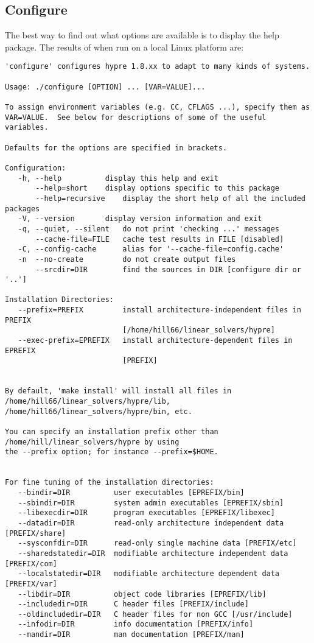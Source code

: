 \subsection{Configure}
\label{Configure}


The best way to find out what options are available is to display the help package.
The results of  when run on a local Linux platform are:
\begin{verbatim}
'configure' configures hypre 1.8.xx to adapt to many kinds of systems.

Usage: ./configure [OPTION] ... [VAR=VALUE]...

To assign environment variables (e.g. CC, CFLAGS ...), specify them as
VAR=VALUE.  See below for descriptions of some of the useful variables.

Defaults for the options are specified in brackets.

Configuration:
   -h, --help		   display this help and exit
       --help=short	   display options specific to this package
       --help=recursive	   display the short help of all the included packages
   -V, --version	   display version information and exit
   -q, --quiet, --silent   do not print 'checking ...' messages
       --cache-file=FILE   cache test results in FILE [disabled]
   -C, --config-cache      alias for '--cache-file=config.cache'
   -n  --no-create         do not create output files
       --srcdir=DIR        find the sources in DIR [configure dir or '..']

Installation Directories:
   --prefix=PREFIX         install architecture-independent files in PREFIX
                           [/home/hill66/linear_solvers/hypre]
   --exec-prefix=EPREFIX   install architecture-dependent files in EPREFIX 
                           [PREFIX]


By default, 'make install' will install all files in
/home/hill66/linear_solvers/hypre/lib, /home/hill66/linear_solvers/hypre/bin, etc.

You can specify an installation prefix other than /home/hill/linear_solvers/hypre by using 
the --prefix option; for instance --prefix=$HOME.


For fine tuning of the installation directories:
   --bindir=DIR          user executables [EPREFIX/bin]
   --sbindir=DIR         system admin executables [EPREFIX/sbin]
   --libexecdir=DIR      program executables [EPREFIX/libexec]
   --datadir=DIR         read-only architecture independent data [PREFIX/share]
   --sysconfdir=DIR      read-only single machine data [PREFIX/etc]
   --sharedstatedir=DIR  modifiable architecture independent data [PREFIX/com]
   --localstatedir=DIR   modifiable architecture dependent data [PREFIX/var]
   --libdir=DIR          object code libraries [EPREFIX/lib]
   --includedir=DIR      C header files [PREFIX/include]
   --oldincludedir=DIR   C header files for non GCC [/usr/include]
   --infodir=DIR         info documentation [PREFIX/info]
   --mandir=DIR          man documentation [PREFIX/man]



\end{verbatim}
